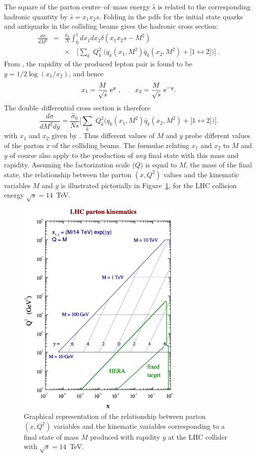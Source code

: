 \documentclass[12pt]{iopart}
\def\beq{\begin{equation}}
\def\eeq{\end{equation}}
\def\beqn{\begin{eqnarray}}
\def\eeqn{\end{eqnarray}}
\begin{document}
The square of the parton centre--of--mass energy $\hat{s}$ is related to the corresponding  hadronic quantity
by  $\hat{s}= x_1 x_2 s$. Folding in the pdfs for the initial state quarks and antiquarks in the colliding beams
gives  the hadronic cross section:
\beqn
 \frac{d \sigma}{d M^2} &=& \frac{\hat{\sigma}_0}{N} \int_0^1 {dx_1} {dx_2} 
 \delta(x_1 x_2 s -M^2)\nonumber \\
& &\times \quad \Big[ \sum_k\;  Q_k^2\; \big( q_k(x_1,M^2) \bar{q}_k(x_2,M^2)
                   +\big[ 1 \leftrightarrow 2 \big]\big)  \Big]\; .
\label{dy:4}
\eeqn
%
From , the rapidity of the produced lepton pair 
is found to be $y= \textstyle{1/2 } \log(x_1/x_2)$, and hence  
\beq
x_1 =\frac{M}{\sqrt{s}}\;  {\rm e}^y\ ,\qquad x_2 =\frac{M}{\sqrt{s}}\;  {\rm e}^{-y}.
\label{dy:6}
\eeq
The double--differential cross section is therefore
\beq
\frac{d \sigma}{d M^2 dy } = \frac{\hat{\sigma}_0}{N s } 
\Big[ \sum_k\;  Q_k^2 \big( q_k(x_1,M^2) \bar{q}_k(x_2,M^2)
                   +\big[ 1 \leftrightarrow 2 \big]\big)  \Big].
\label{dy:7}
\eeq
with $x_1$ and $x_2$ given by . Thus different values of $M$ and $y$ probe different values of the
parton $x$ of the colliding beams. The formulae relating $x_1$ and $x_2$ to $M$ and $y$ of course also apply to
the production of {\it any} final state with this mass and rapidity. Assuming the factorization scale ($Q$) is
equal to $M$, the mass of the final state, the relationship between the parton $(x,Q^2)$ values and the
kinematic variables $M$ and $y$ is illustrated pictorially in Figure~\ref{fig:lhcxq}, for the LHC collision energy
$\sqrt{s} = 14$~TeV.
%
\begin{figure}[t]                                                               
\begin{center}     
\includegraphics[width=8cm]{lhcgridc.ps}     
\end{center}    
\caption{Graphical representation of the relationship between parton $(x,Q^2)$ variables and the kinematic
variables corresponding to a final state of mass $M$ produced with rapidity $y$
at the LHC collider with $\sqrt{s} = 14$~TeV.\label{fig:lhcxq}}                    
\end{figure}    
\end{document}
